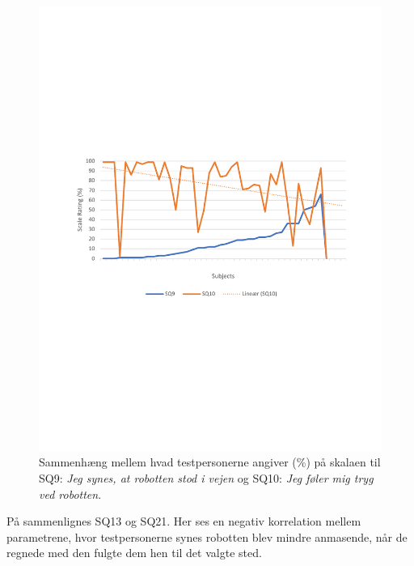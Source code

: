 %
\begin{figure}[H]
	\centering
	\includegraphics[width=\textwidth]{Figure/Korrelationsgrafer/SQ9+SQ10}
	\caption{Sammenhæng mellem hvad testpersonerne angiver (\%) på skalaen til SQ9: \textit{Jeg synes, at robotten stod i vejen} og SQ10: \textit{Jeg føler mig tryg ved robotten}.}
	\label{fig:SammenligningSQ9SQ10}
\end{figure}
\noindent
%
På  sammenlignes SQ13 og SQ21. Her ses en negativ korrelation mellem parametrene, hvor testpersonerne synes robotten blev mindre anmasende, når de regnede med den fulgte dem hen til det valgte sted.
%
